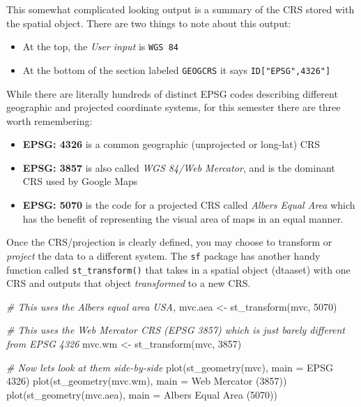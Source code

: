 \documentclass[
]{book}
\newenvironment{Shaded}{\begin{snugshade}}{\end{snugshade}}
\newcommand{\AttributeTok}[1]{\textcolor[rgb]{0.77,0.63,0.00}{#1}}
\newcommand{\CommentTok}[1]{\textcolor[rgb]{0.56,0.35,0.01}{\textit{#1}}}
\newcommand{\DecValTok}[1]{\textcolor[rgb]{0.00,0.00,0.81}{#1}}
\newcommand{\FunctionTok}[1]{\textcolor[rgb]{0.00,0.00,0.00}{#1}}
\newcommand{\NormalTok}[1]{#1}
\newcommand{\OtherTok}[1]{\textcolor[rgb]{0.56,0.35,0.01}{#1}}
\newcommand{\StringTok}[1]{\textcolor[rgb]{0.31,0.60,0.02}{#1}}
\providecommand{\tightlist}{%
  \setlength{\itemsep}{0pt}\setlength{\parskip}{0pt}}
\begin{document}
This somewhat complicated looking output is a summary of the CRS stored with the spatial object. There are two things to note about this output:

\begin{itemize}
\tightlist
\item
  At the top, the \emph{User input} is \texttt{WGS\ 84}
\item
  At the bottom of the section labeled \texttt{GEOGCRS} it says \texttt{ID{[}"EPSG",4326"{]}}
\end{itemize}

While there are literally hundreds of distinct EPSG codes describing different geographic and projected coordinate systems, for this semester there are three worth remembering:

\begin{itemize}
\tightlist
\item
  \textbf{EPSG: 4326} is a common geographic (unprojected or long-lat) CRS
\item
  \textbf{EPSG: 3857} is also called \emph{WGS 84/Web Mercator}, and is the dominant CRS used by Google Maps
\item
  \textbf{EPSG: 5070} is the code for a projected CRS called \emph{Albers Equal Area} which has the benefit of representing the visual area of maps in an equal manner.
\end{itemize}

Once the CRS/projection is clearly defined, you may choose to transform or \emph{project} the data to a different system. The \texttt{sf} package has another handy function called \texttt{st\_transform()} that takes in a spatial object (dtaaset) with one CRS and outputs that object \emph{transformed} to a new CRS.

\begin{Shaded}
\begin{Highlighting}[]
\CommentTok{\# This uses the Albers equal area USA, }
\NormalTok{mvc.aea }\OtherTok{\textless{}{-}} \FunctionTok{st\_transform}\NormalTok{(mvc, }\DecValTok{5070}\NormalTok{)}

\CommentTok{\# This uses the Web Mercator CRS (EPSG 3857) which is just barely different from EPSG 4326}
\NormalTok{mvc.wm }\OtherTok{\textless{}{-}} \FunctionTok{st\_transform}\NormalTok{(mvc, }\DecValTok{3857}\NormalTok{)}

\CommentTok{\# Now let\textquotesingle{}s look at them side{-}by{-}side}
\FunctionTok{plot}\NormalTok{(}\FunctionTok{st\_geometry}\NormalTok{(mvc), }\AttributeTok{main =} \StringTok{\textquotesingle{}EPSG 4326\textquotesingle{}}\NormalTok{)}
\FunctionTok{plot}\NormalTok{(}\FunctionTok{st\_geometry}\NormalTok{(mvc.wm), }\AttributeTok{main =} \StringTok{\textquotesingle{}Web Mercator (3857)\textquotesingle{}}\NormalTok{)}
\FunctionTok{plot}\NormalTok{(}\FunctionTok{st\_geometry}\NormalTok{(mvc.aea), }\AttributeTok{main =} \StringTok{\textquotesingle{}Albers Equal Area (5070)\textquotesingle{}}\NormalTok{)}
\end{Highlighting}
\end{Shaded}
\end{document}
